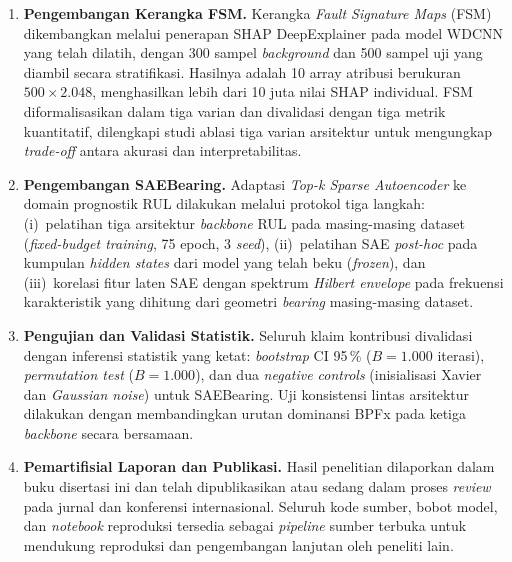 \begin{enumerate}
  \item \textbf{Pengembangan Kerangka FSM.}
        Kerangka \emph{Fault Signature Maps} (FSM) dikembangkan melalui
        penerapan SHAP DeepExplainer pada model WDCNN yang telah dilatih,
        dengan 300 sampel \emph{background} dan 500 sampel uji yang
        diambil secara stratifikasi.
        Hasilnya adalah 10 array atribusi berukuran $500 \times 2.048$,
        menghasilkan lebih dari 10 juta nilai SHAP individual.
        FSM diformalisasikan dalam tiga varian dan divalidasi dengan tiga
        metrik kuantitatif, dilengkapi studi ablasi tiga varian arsitektur
        untuk mengungkap \emph{trade-off} antara akurasi dan
        interpretabilitas.

  \item \textbf{Pengembangan SAEBearing.}
        Adaptasi \emph{Top-k Sparse Autoencoder} ke domain prognostik RUL
        dilakukan melalui protokol tiga langkah: (i)~pelatihan tiga
        arsitektur \emph{backbone} RUL pada masing-masing dataset
        (\emph{fixed-budget training}, 75 epoch, 3 \emph{seed}),
        (ii)~pelatihan SAE \emph{post-hoc} pada kumpulan \emph{hidden
        states} dari model yang telah beku (\emph{frozen}), dan
        (iii)~korelasi fitur laten SAE dengan spektrum \emph{Hilbert
        envelope} pada frekuensi karakteristik yang dihitung dari geometri
        \emph{bearing} masing-masing dataset.

  \item \textbf{Pengujian dan Validasi Statistik.}
        Seluruh klaim kontribusi divalidasi dengan inferensi statistik yang
        ketat: \emph{bootstrap} CI 95\,\% ({\color{blue}$B = 1.000$ iterasi}), \emph{permutation
        test} ({\color{blue}$B = 1.000$}), dan dua \emph{negative controls} (inisialisasi
        Xavier dan \emph{Gaussian noise}) untuk SAEBearing.
        Uji konsistensi lintas arsitektur dilakukan dengan membandingkan
        urutan dominansi BPFx pada ketiga \emph{backbone} secara bersamaan.

  \item \textbf{Pemartifisial Laporan dan Publikasi.}
        Hasil penelitian dilaporkan dalam buku disertasi ini dan telah
        dipublikasikan atau sedang dalam proses \emph{review} pada jurnal
        dan konferensi internasional.
        Seluruh kode sumber, bobot model, dan \emph{notebook} reproduksi
        tersedia sebagai \emph{pipeline} sumber terbuka untuk mendukung
        reproduksi dan pengembangan lanjutan oleh peneliti lain.

\end{enumerate}

